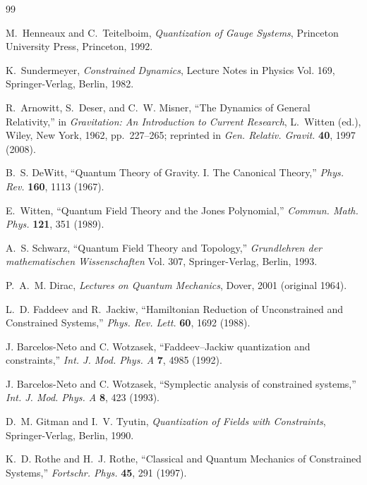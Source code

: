 \documentclass[11pt,a4paper]{article}
\begin{document}

\begin{thebibliography}{99}
	
	M.~Henneaux and C.~Teitelboim, \textit{Quantization of Gauge Systems}, Princeton University Press, Princeton, 1992.
	
	K.~Sundermeyer, \textit{Constrained Dynamics}, Lecture Notes in Physics Vol. 169, Springer-Verlag, Berlin, 1982.
	
	R.~Arnowitt, S.~Deser, and C.~W. Misner, ``The Dynamics of General Relativity,'' in \textit{Gravitation: An Introduction to Current Research}, L.~Witten (ed.), Wiley, New York, 1962, pp.~227--265; reprinted in \textit{Gen. Relativ. Gravit.} \textbf{40}, 1997 (2008).
	
	B.~S. DeWitt, ``Quantum Theory of Gravity. I. The Canonical Theory,'' \textit{Phys. Rev.} \textbf{160}, 1113 (1967).
	
	E.~Witten, ``Quantum Field Theory and the Jones Polynomial,'' \textit{Commun. Math. Phys.} \textbf{121}, 351 (1989).
	
	A.~S. Schwarz, ``Quantum Field Theory and Topology,'' \textit{Grundlehren der mathematischen Wissenschaften} Vol. 307, Springer-Verlag, Berlin, 1993.
	
	P.~A.~M. Dirac, \textit{Lectures on Quantum Mechanics}, Dover, 2001 (original 1964).
	
	L.~D. Faddeev and R.~Jackiw, ``Hamiltonian Reduction of Unconstrained and Constrained Systems,'' \textit{Phys. Rev. Lett.} \textbf{60}, 1692 (1988).
	
	J. Barcelos-Neto and C. Wotzasek, ``Faddeev--Jackiw quantization and constraints,'' \textit{Int. J. Mod. Phys. A} \textbf{7}, 4985 (1992).
	
	J. Barcelos-Neto and C. Wotzasek, ``Symplectic analysis of constrained systems,'' \textit{Int. J. Mod. Phys. A} \textbf{8}, 423 (1993).
	
	D.~M. Gitman and I.~V. Tyutin, \textit{Quantization of Fields with Constraints}, Springer-Verlag, Berlin, 1990.
	
	K.~D. Rothe and H.~J. Rothe, ``Classical and Quantum Mechanics of Constrained Systems,'' \textit{Fortschr. Phys.} \textbf{45}, 291 (1997).
	

\end{thebibliography}
\end{document}
